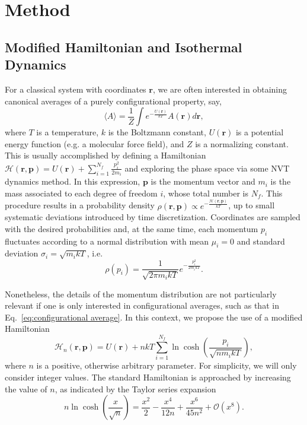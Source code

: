 \documentclass[
aip,
jcp,
reprint,
]{revtex4-1}
\newcommand{\vt}[1]{\boldsymbol{\mathbf{#1}}}          %
\begin{document}
\section{Method}

\subsection{Modified Hamiltonian and Isothermal Dynamics}

For a classical system with coordinates $\vt r$, we are often interested in obtaining canonical averages of a purely configurational property, say,
\begin{equation}
\label{eq:configurational average}
\langle A \rangle = \frac{1}{Z} \int e^{-\frac{U(\vt r)}{kT}} A(\vt r) d\vt r,
\end{equation}
where $T$ is a temperature, $k$ is the Boltzmann constant, $U(\vt r)$ is a potential energy function (e.g. a molecular force field), and $Z$ is a normalizing constant.
This is usually accomplished by defining a Hamiltonian $\mathcal{H}(\vt r, \vt p) = U(\vt r) + \sum_{i=1}^{N_f} \frac{p_i^2}{2 m_i}$ and exploring the phase space via some NVT dynamics method.
In this expression, $\vt p$ is the momentum vector and $m_i$ is the mass associated to each degree of freedom $i$, whose total number is $N_f$.
This procedure results in a probability density $\rho(\vt r, \vt p) \propto e^{-\frac{\mathcal{H}(\vt r, \vt p)}{kT}}$, up to small systematic deviations introduced by time discretization.
Coordinates are sampled with the desired probabilities and, at the same time, each momentum $p_i$ fluctuates according to a normal distribution with mean $\mu_i = 0$ and standard deviation $\sigma_i = \sqrt{m_i k T}$, i.e.
\begin{equation}
\label{eq:gaussian momentum distribution}
\rho(p_i) = \frac{1}{\sqrt{2 \pi m_i k T}} e^{-\frac{p_i^2}{2 m_i k T}}.
\end{equation}

Nonetheless, the details of the momentum distribution are not particularly relevant if one is only interested in configurational averages, such as that in Eq.~\eqref{eq:configurational average}.
In this context, we propose the use of a modified Hamiltonian
\begin{equation}
\label{eq:modified hamiltonian}
\mathcal{H}_n(\vt r, \vt p) = U(\vt r) + n kT \sum_{i=1}^{N_f} \ln \cosh\left(\frac{p_i}{\sqrt{n m_i k T}}\right),
\end{equation}
where $n$ is a positive, otherwise arbitrary parameter.
For simplicity, we will only consider integer values.
The standard Hamiltonian is approached by increasing the value of $n$, as indicated by the Taylor series expansion
\begin{equation*}
n \ln \cosh \left(\frac{x}{\sqrt{n}}\right) = \frac{x^2}{2} - \frac{x^4}{12 n} + \frac{x^6}{45 n^2} + \mathcal{O}(x^8).
\end{equation*}
\end{document}
